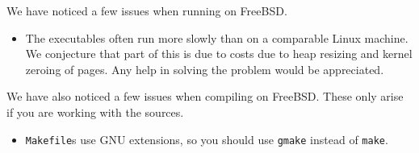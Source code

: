
We have noticed a few issues when running {\mlton} on FreeBSD.  

\begin{itemize}

\item
The executables often run more slowly than on a comparable Linux
machine.  We conjecture that part of this is due to costs due to heap
resizing and kernel zeroing of pages.  Any help in solving the problem
would be appreciated.

\end{itemize}

We have also noticed a few issues when compiling {\mlton} on FreeBSD.  These
only arise if you are working with the {\mlton} sources.

\begin{itemize}

\item {\mlton} {\tt Makefile}s use GNU extensions, so you should use {\tt gmake}
instead of {\tt make}.

\end{itemize}
